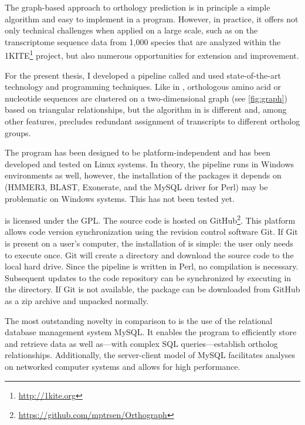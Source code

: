 The graph-based approach to orthology prediction is in principle a simple
algorithm and easy to implement in a program. However, in practice, it offers
not only technical challenges when applied on a large scale, such as on the
transcriptome sequence data from 1,000 species that are analyzed within the
1KITE\footnote{\url{http://1kite.org}} project, but also numerous opportunities
for extension and improvement. 

For the present thesis, I developed a pipeline called \pname and used
state-of-the-art technology and programming techniques. Like in \hamstr,
orthologous amino acid or nucleotide sequences are clustered on a
two-dimensional graph (see \autoref{fig:graph}) based on triangular
relationships, but the algorithm in \pname is different and, among other
features, precludes redundant assignment of transcripts to different ortholog
groups.



The program has been designed to be platform-independent and has been developed
and tested on Linux systems. In theory, the pipeline runs in Windows
environments as well, however, the installation of the packages it depends on
(HMMER3, BLAST, Exonerate, and the MySQL driver for Perl) may be problematic on
Windows systems. This has not been tested yet.

\pname is licensed under the GPL. The source code is hosted on
GitHub\footnote{\url{https://github.com/mptrsen/Orthograph}}. This platform
allows code version synchronization using the revision control software Git. If
Git is present on a user's computer, the installation of \pname is simple: the
user only needs to execute  once. Git will create a directory and
download the source code to the local hard drive. Since the pipeline is written
in Perl, no compilation is necessary. Subsequent updates to the code repository
can be synchronized by executing  in the \pname directory. If Git
is not available, the package can be downloaded from GitHub as a zip archive and
unpacked normally.

The most outstanding novelty in comparison to \hamstr is the use of the
relational database management system MySQL. It enables the program to
efficiently store and retrieve data as well as---with complex SQL
queries---establish ortholog relationships. Additionally, the server-client
model of MySQL facilitates analyses on networked computer systems and allows for
high performance.

